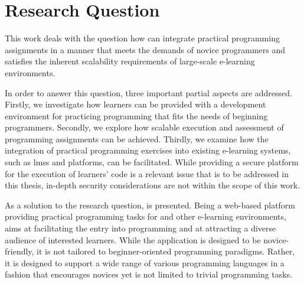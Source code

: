 \section{Research Question}

This work deals with the question how \moocs can integrate practical programming assignments in a manner that meets the demands of novice programmers and satisfies the inherent scalability requirements of large-scale e-learning environments.

In order to answer this question, three important partial aspects are addressed. Firstly, we investigate how learners can be provided with a development environment for practicing programming that fits the needs of beginning programmers. Secondly, we explore how scalable execution and assessment of programming assignments can be achieved. Thirdly, we examine how the integration of practical programming exercises into existing e-learning systems, such as \glspl{lms} and \mooc platforms, can be facilitated. While providing a secure platform for the execution of learners' code is a relevant issue that is to be addressed in this thesis, in-depth security considerations are not within the scope of this work.

As a solution to the research question, \tool is presented. Being a web-based platform providing practical programming tasks for \moocs and other e-learning environments, \tool aims at facilitating the entry into programming and at attracting a diverse audience of interested learners. While the application is designed to be novice-friendly, it is not tailored to beginner-oriented programming paradigms. Rather, it is designed to support a wide range of various programming languages in a fashion that encourages novices yet is not limited to trivial programming tasks.
